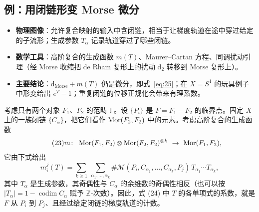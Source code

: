 
\subsection{例：用闭链形变 Morse 微分}\label{sec:2.4}

\begin{takeaway}
\begin{itemize}
  \item \textbf{物理图像}：允许复合映射的输入中含闭链，相当于让梯度轨道在途中穿过给定的子流形；生成参数 $T_\alpha$ 记录轨道穿过了哪些闭链。
  \item \textbf{数学工具}：高阶复合的生成函数 $m(T)$、Maurer--Cartan 方程、同调扰动引理（经 Morse 收缩把 de Rham 复形上的扰动 $\mathrm{d}_2$ 转移到 Morse 复形上）。
  \item \textbf{主要结论}：$\mathrm{d}_{\mathrm{Morse}}+m(T)$ 仍是微分，即式~\eqref{eq:25}；在 $X=S^1$ 的玩具例子中形变给出 $e^T-1$；重复闭链的位移正规化会带来有理系数。
\end{itemize}
\end{takeaway}

考虑只有两个对象 $F_1$、$F_2$ 的范畴 $\mathbb{F}$。设 $\{P_i\}$ 是 $F=F_1-F_2$ 的临界点。固定 $X$ 上的一族闭链 $\{C_\alpha\}$，把它们看作 $\operatorname{Mor}(F_2,F_2)$ 中的元素。考虑高阶复合的生成函数
\begin{equation}\tag{23}\label{eq:23}
  m\colon\ \Mor(F_1,F_2)\otimes\Mor(F_2,F_2)^{\otimes k}\ \to\ \Mor(F_1,F_2),
\end{equation}
它由下式给出
\begin{equation}\tag{24}\label{eq:24}
  m_i^j(T)=\sum_{k\ge 1}\ \sum_{\alpha_1,\dots,\alpha_k}
  \#\mathcal M(P_i,C_{\alpha_1},\dots,C_{\alpha_k},P_j)\,T_{\alpha_1}\cdots T_{\alpha_k},
\end{equation}
其中 $T_\alpha$ 是生成参数，其奇偶性与 $C_\alpha$ 的余维数的奇偶性相反（也可以按 $|T_\alpha|=1-\operatorname{codim}C_\alpha$ 赋予 $\mathbb Z$-次数）。因此，式 (24) 中 $T$ 的各单项式的系数，就是 $F$ 从 $P_i$ 到 $P_j$、且经过给定闭链的梯度轨道的计数。


